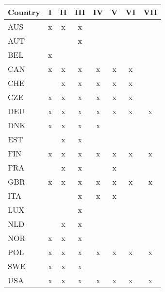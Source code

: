 \begin{tabular}{lccccccc}
Country & I & II & III & IV & V & VI & VII \\  \hline 
AUS&x&x&x&&&&\\
AUT&&&x&&&&\\
BEL&x&&&&&&\\
CAN&x&x&x&x&x&x&\\
CHE&&x&x&x&x&x&\\
CZE&x&x&x&x&x&x&\\
DEU&x&x&x&x&x&x&x\\
DNK&x&x&x&x&&&\\
EST&&x&x&&&&\\
FIN&x&x&x&x&x&x&x\\
FRA&&x&x&&x&&\\
GBR&x&x&x&x&x&x&x\\
ITA&&&x&x&x&&\\
LUX&&&x&&&&\\
NLD&&x&x&&&&\\
NOR&x&x&x&&&&\\
POL&x&x&x&x&x&x&x\\
SWE&x&x&x&&&&\\
USA&x&x&x&x&x&x&x\\
\hline \end{tabular}
